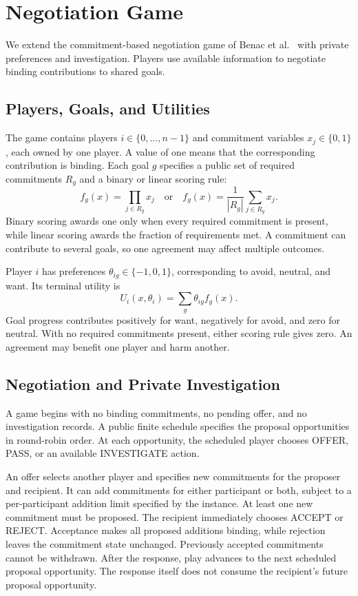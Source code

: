 \documentclass[11pt,a4paper]{article}
\begin{document}
\section{Negotiation Game}
\label{sec:game}
We extend the commitment-based negotiation game of Benac et
al.~\cite{benac2026benchmark} with private preferences and investigation. Players use
available information to negotiate binding contributions to shared goals.

\subsection{Players, Goals, and Utilities}
The game contains players $i\in\{0,\ldots,n-1\}$ and commitment variables
$x_j\in\{0,1\}$, each owned by one player. A value of one means that the
corresponding contribution is binding. Each goal $g$ specifies a public
set of required commitments $R_g$ and a binary or linear scoring rule:
\begin{equation}
 f_g(x)=\prod_{j\in R_g}x_j
 \quad\text{or}\quad
 f_g(x)=\frac{1}{|R_g|}\sum_{j\in R_g}x_j.
 \label{eq:completion}
\end{equation}
Binary scoring awards one only when every required commitment is present, while
linear scoring awards the fraction of requirements met. A commitment can
contribute to several goals, so one agreement may affect multiple outcomes.

Player $i$ has preferences $\theta_{ig}\in\{-1,0,1\}$, corresponding to
avoid, neutral, and want. Its terminal utility is
\begin{equation}
 U_i(x,\theta_i)=\sum_g\theta_{ig}f_g(x).
 \label{eq:utility}
\end{equation}
Goal progress contributes positively for want, negatively for avoid, and
zero for neutral. With no required commitments present, either scoring
rule gives zero. An agreement may benefit one player and harm another.

\subsection{Negotiation and Private Investigation}
A game begins with no binding commitments, no pending offer, and no
investigation records. A public finite schedule specifies the proposal
opportunities in round-robin order. At each opportunity, the scheduled
player chooses OFFER, PASS, or an available INVESTIGATE action.

An offer selects another player and specifies new commitments for the
proposer and recipient. It can add commitments for either participant or
both, subject to a per-participant addition limit specified by the
instance. At least one new commitment must be proposed. The recipient
immediately chooses ACCEPT or REJECT. Acceptance makes all proposed
additions binding, while rejection leaves the commitment state unchanged.
Previously accepted commitments cannot be withdrawn. After the response,
play advances to the next scheduled proposal opportunity. The response
itself does not consume the recipient's future proposal opportunity.
\end{document}
